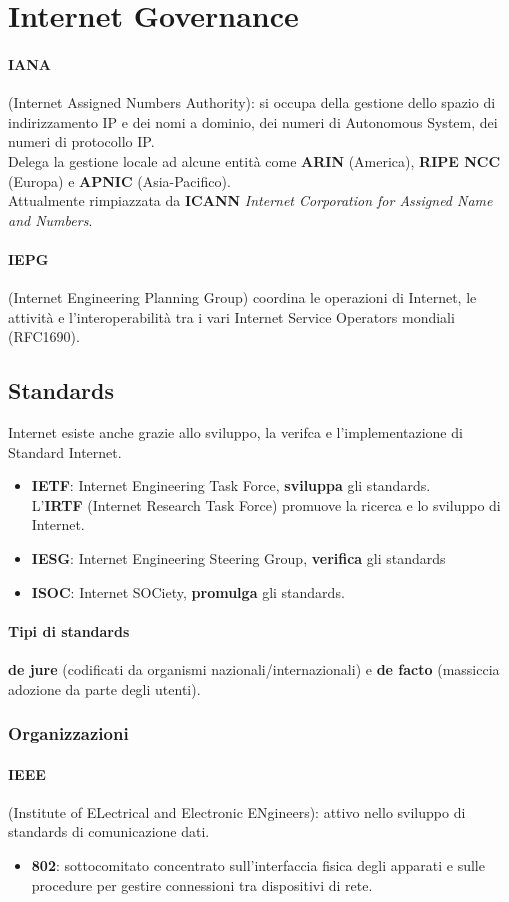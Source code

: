 \documentclass[a4paper,11pt]{article}
\def\para#1{\paragraph{#1}\label{#1}}
\begin{document}

\section{Internet Governance}
\para{IANA} (Internet Assigned Numbers Authority): si occupa della gestione dello spazio di indirizzamento IP e dei nomi a dominio, dei numeri di Autonomous System, dei numeri di protocollo IP.\\
Delega la gestione locale  ad alcune entità come \textbf{ARIN} (America), \textbf{RIPE NCC} (Europa) e \textbf{APNIC} (Asia-Pacifico).\\
Attualmente rimpiazzata da \textbf{ICANN} \textit{Internet Corporation for Assigned Name and Numbers}.

\para{IEPG} (Internet Engineering Planning Group) coordina le operazioni di Internet, le attività e l’interoperabilità tra i vari 
Internet Service Operators mondiali (RFC1690).

\subsection{Standards}
Internet esiste anche grazie allo sviluppo, la verifca e l’implementazione di Standard Internet.
\begin{itemize}
\item \textbf{IETF}: Internet Engineering Task Force, \textbf{sviluppa} gli standards. \\L'\textbf{IRTF} (Internet Research Task Force) promuove la ricerca e lo sviluppo di Internet. 
\item \textbf{IESG}: Internet Engineering Steering Group, \textbf{verifica} gli standards
\item \textbf{ISOC}: Internet SOCiety, \textbf{promulga} gli standards.
\end{itemize}
\paragraph{Tipi di standards} \textbf{de jure} (codificati da organismi nazionali/internazionali) e \textbf{de facto} (massiccia adozione da parte degli utenti).
\subsubsection{Organizzazioni}
\paragraph{IEEE} (Institute of ELectrical and Electronic ENgineers): attivo nello sviluppo di standards di comunicazione dati. 
\begin{itemize}
\item \textbf{802}: sottocomitato concentrato sull'interfaccia fisica degli apparati e sulle procedure per gestire connessioni tra dispositivi di rete.
\end{itemize}
\end{document}
